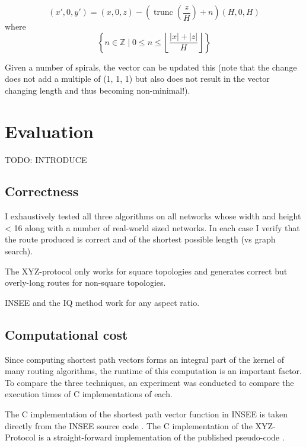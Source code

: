 			\begin{equation}
				(x', 0, y') = (x, 0, z) - (\operatorname{trunc}\left(\frac{z}{H}\right) + n)(H, 0, H)
			\end{equation}
			where
			\begin{equation}
				\left\{
					n \in \mathbb{Z}
				\;\Big|\;
					0 \le n \le
						\left\lfloor
							\frac{\left|x\right| + \left|z\right|}{H}
						\right\rfloor
				\right\}
			\end{equation}
			
			Given a number of spirals, the vector can be updated this (note that the
			change does not add a multiple of (1, 1, 1) but also does not result in
			the vector changing length and thus becoming non-minimal!).
	
	\section{Evaluation}
		
		TODO: INTRODUCE
		
		\subsection{Correctness}
			
			I exhaustively tested all three algorithms on all networks whose width
			and height < 16 along with a number of real-world sized networks. In each
			case I verify that the route produced is correct and of the shortest
			possible length (vs graph search).
			
			The XYZ-protocol only works for square topologies and generates correct
			but overly-long routes for non-square topologies.
			
			INSEE and the IQ method work for any aspect ratio.
		
		\subsection{Computational cost}
			
			Since computing shortest path vectors forms an integral part of the
			kernel of many routing algorithms, the runtime of this computation is an
			important factor. To compare the three techniques, an experiment was
			conducted to compare the execution times of C implementations of each.
			
			The C implementation of the shortest path vector function in INSEE is
			taken directly from the INSEE source code \cite{navaridas09}. The C
			implementation of the XYZ-Protocol is a straight-forward implementation
			of the published pseudo-code \cite{hoffmann15}.
			
